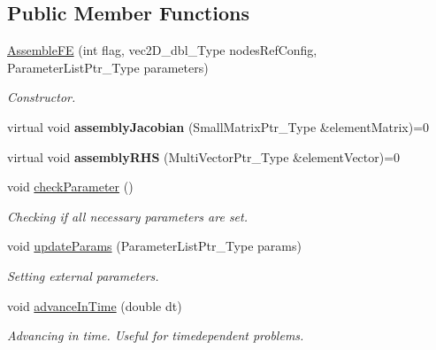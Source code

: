 \subsection*{Public Member Functions}
\begin{DoxyCompactItemize}
\item 
\hyperlink{classFEDD_1_1AssembleFE_a01b82579a8bb5060009bda0c69fbf891}{Assemble\+FE} (int flag, vec2\+D\+\_\+dbl\+\_\+\+Type nodes\+Ref\+Config, Parameter\+List\+Ptr\+\_\+\+Type parameters)
\begin{DoxyCompactList}\small\item\em Constructor. \end{DoxyCompactList}\item 
\mbox{\label{classFEDD_1_1AssembleFE_a5e642d141dcb5c076f1620b4cb06cdac}} 
virtual void {\bfseries assembly\+Jacobian} (Small\+Matrix\+Ptr\+\_\+\+Type \&element\+Matrix)=0
\item 
\mbox{\label{classFEDD_1_1AssembleFE_ad7492c0ffbce232f382d6c1422dc7e83}} 
virtual void {\bfseries assembly\+R\+HS} (Multi\+Vector\+Ptr\+\_\+\+Type \&element\+Vector)=0
\item 
\mbox{\label{classFEDD_1_1AssembleFE_a54942b2e3e8e0aaf321a893f209e3309}} 
void \hyperlink{classFEDD_1_1AssembleFE_a54942b2e3e8e0aaf321a893f209e3309}{check\+Parameter} ()
\begin{DoxyCompactList}\small\item\em Checking if all necessary parameters are set. \end{DoxyCompactList}\item 
void \hyperlink{classFEDD_1_1AssembleFE_a48ea6d9259f538a88fa5b21667869bce}{update\+Params} (Parameter\+List\+Ptr\+\_\+\+Type params)
\begin{DoxyCompactList}\small\item\em Setting external parameters. \end{DoxyCompactList}\item 
void \hyperlink{classFEDD_1_1AssembleFE_aa291b30d2a3f78705b2a7722a1a04d96}{advance\+In\+Time} (double dt)
\begin{DoxyCompactList}\small\item\em Advancing in time. Useful for timedependent problems. \end{DoxyCompactList}\item 

\end{DoxyCompactItemize}
